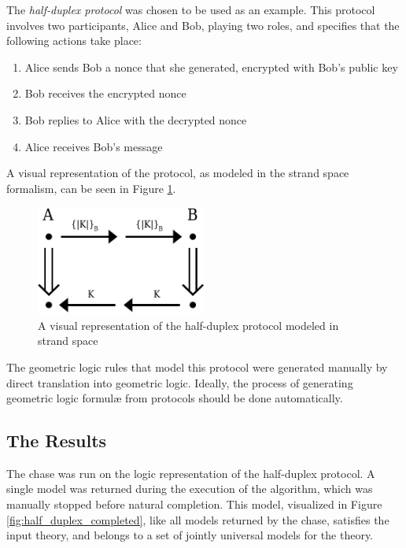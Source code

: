 		The \emph{half-duplex protocol} was chosen to be used as an example.
		This protocol involves two participants, Alice and Bob, playing two
		roles, and specifies that the following actions take place:

		\begin{enumerate}
		\item Alice sends Bob a nonce that she generated, encrypted with Bob's public key
		\item Bob receives the encrypted nonce
		\item Bob replies to Alice with the decrypted nonce
		\item Alice receives Bob's message
		\end{enumerate}

		A visual representation of the protocol, as modeled in the strand space
		formalism, can be seen in Figure \ref{fig:half_duplex}.

		\begin{figure}[h]
			\centering
			\includegraphics[width=0.5\textwidth]{half-duplex}
			\caption{
				A visual representation of the half-duplex protocol modeled in strand space
				\label{fig:half_duplex}
			}
		\end{figure}

		The geometric logic rules that model this protocol were generated
		manually by direct translation into geometric logic. Ideally, the
		process of generating geometric logic formul{\ae} from protocols should
		be done automatically.

	\subsection{The Results}

		The chase was run on the logic representation of the half-duplex
		protocol. A single model was returned during the execution of the
		algorithm, which was manually stopped before natural completion. This
		model, visualized in Figure \ref{fig:half_duplex_completed}, like all
		models returned by the chase, satisfies the input theory, and belongs
		to a set of jointly universal models for the theory.

